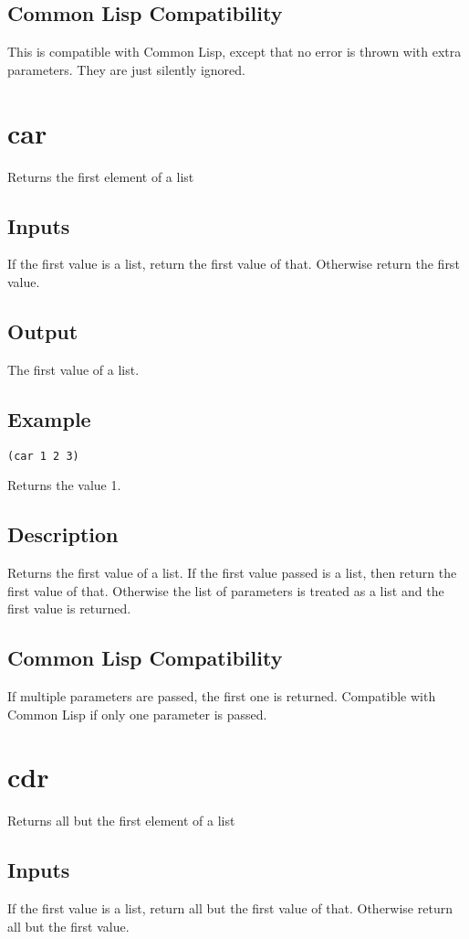 \documentclass[10pt, openany]{book}
\newcommand{\cl}{Common Lisp}
\begin{document}
\subsection{Common Lisp Compatibility}
This is compatible with \cl, except that no error is thrown with extra parameters.  They are just silently ignored.

\section{car}
Returns the first element of a list
\subsection{Inputs}
If the first value is a list, return the first value of that.  Otherwise return the first value.
\subsection{Output}
The first value of a list.
\subsection{Example}
\begin{lstlisting}
(car 1 2 3)
\end{lstlisting}
Returns the value 1.
\subsection{Description}
Returns the first value of a list.  If the first value passed is a list, then return the first value of that.  Otherwise the list of parameters is treated as a list and the first value is returned.
\subsection{Common Lisp Compatibility}
If multiple parameters are passed, the first one is returned.  Compatible with \cl{} if only one parameter is passed.

\section{cdr}
Returns all but the first element of a list
\subsection{Inputs}
If the first value is a list, return all but the first value of that.  Otherwise return all but the first value.
\end{document}
